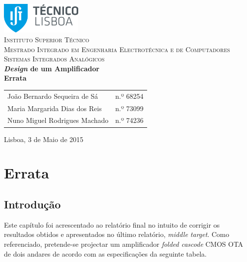 \documentclass[11pt]{article}
\numberwithin{equation}{section}
\begin{document}
\begin{titlepage}
\begin{center}

\hfill \break
\hfill \break

\includegraphics[width=0.3\textwidth]{./logo}~\\[1cm]

\textsc{\LARGE Instituto Superior Técnico}\\[0.25cm]
\textsc{\Large Mestrado Integrado em Engenharia Electrotécnica e de Computadores}\\[1.8cm]
\textsc{\huge Sistemas Integrados Analógicos}\\[0.25cm]

{\huge \bfseries \textit{Design} de um Amplificador \\[0.2cm]
				Errata\\[2cm]}

\begin{tabular}{ l l }
João Bernardo Sequeira de Sá & \hspace{2mm} n.º 68254 \\
Maria Margarida Dias dos Reis & \hspace{2mm} n.º 73099 \\
Nuno Miguel Rodrigues Machado & \hspace{2mm} n.º 74236
\end{tabular}

\vfill

{\large Lisboa, 3 de Maio de 2015} 

\end{center}
\end{titlepage}

\clearpage

\tableofcontents
\pagebreak

\clearpage
{}

\section{Errata}

\subsection{Introdução}

Este capítulo foi acrescentado ao relatório final no intuito de corrigir os resultados obtidos e apresentados no último relatório, \textit{middle target}. Como referenciado, pretende-se projectar um amplificador \textit{folded cascode} CMOS OTA de dois andares de acordo com as especificações da seguinte tabela.
\end{document}

